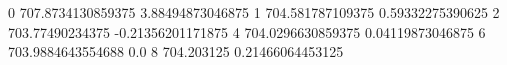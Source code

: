 0 707.8734130859375 3.88494873046875
1 704.581787109375 0.59332275390625
2 703.77490234375 -0.21356201171875
4 704.0296630859375 0.04119873046875
6 703.9884643554688 0.0
8 704.203125 0.21466064453125
